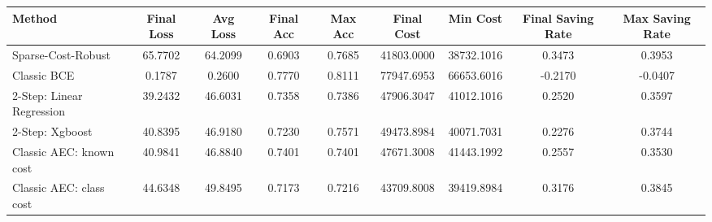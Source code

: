 \begin{tabular}{lcccccccc}
\toprule
Method & Final Loss & Avg Loss & Final Acc & Max Acc & Final Cost & Min Cost & Final Saving Rate & Max Saving Rate \\
\midrule
Sparse-Cost-Robust & 65.7702 & 64.2099 & 0.6903 & 0.7685 & 41803.0000 & 38732.1016 & 0.3473 & 0.3953 \\
Classic BCE & 0.1787 & 0.2600 & 0.7770 & 0.8111 & 77947.6953 & 66653.6016 & -0.2170 & -0.0407 \\
2-Step: Linear Regression & 39.2432 & 46.6031 & 0.7358 & 0.7386 & 47906.3047 & 41012.1016 & 0.2520 & 0.3597 \\
2-Step: Xgboost & 40.8395 & 46.9180 & 0.7230 & 0.7571 & 49473.8984 & 40071.7031 & 0.2276 & 0.3744 \\
Classic AEC: known cost & 40.9841 & 46.8840 & 0.7401 & 0.7401 & 47671.3008 & 41443.1992 & 0.2557 & 0.3530 \\
Classic AEC: class cost & 44.6348 & 49.8495 & 0.7173 & 0.7216 & 43709.8008 & 39419.8984 & 0.3176 & 0.3845 \\
\bottomrule
\end{tabular}
